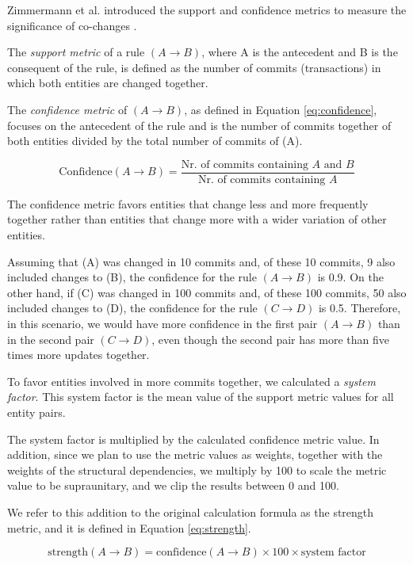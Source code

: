 \documentclass{ieeeaccess}
\begin{document}
Zimmermann et al. introduced the support and confidence metrics to measure the significance of co-changes \cite{b7}.

The \textit{support metric} of a rule $(A \rightarrow B)$, where A is the antecedent and B is the consequent of the rule, is defined as the number of commits (transactions) in which both entities are changed together.

The \textit{confidence metric} of $(A \rightarrow B)$, as defined in Equation \eqref{eq:confidence}, focuses on the antecedent of the rule and is the number of commits together of both entities divided by the total number of commits of (A).


\begin{equation}
\text{Confidence}(A \rightarrow B) = \frac{\text{Nr. of commits containing } A \text{ and } B}{\text{Nr. of commits containing } A}
\label{eq:confidence}
\end{equation}


The confidence metric favors entities that change less and more frequently together rather than entities that change more with a wider variation of other entities.

Assuming that (A) was changed in 10 commits and, of these 10 commits, 9 also included changes to (B), the confidence for the rule $(A \rightarrow B)$ is 0.9. On the other hand, if (C) was changed in 100 commits and, of these 100 commits, 50 also included changes to (D), the confidence for the rule $(C \rightarrow D)$ is 0.5. Therefore, in this scenario, we would have more confidence in the first pair $(A \rightarrow B)$ than in the second pair $(C \rightarrow D)$, even though the second pair has more than five times more updates together.

To favor entities involved in more commits together, we calculated a \textit{system factor}. This system factor is the mean value of the support metric values for all entity pairs.

The system factor is multiplied by the calculated confidence metric value. In addition, since we plan to use the metric values as weights, together with the weights of the structural dependencies, we multiply by 100 to scale the metric value to be supraunitary, and we clip the results between 0 and 100.


We refer to this addition to the original calculation formula as the strength metric, and it is defined in Equation \eqref{eq:strength}.

\begin{equation}
\text{strength}(A \rightarrow B) = \text{confidence}(A \rightarrow B) \times 100 \times \text{system factor}
\label{eq:strength}
\end{equation}
\end{document}
